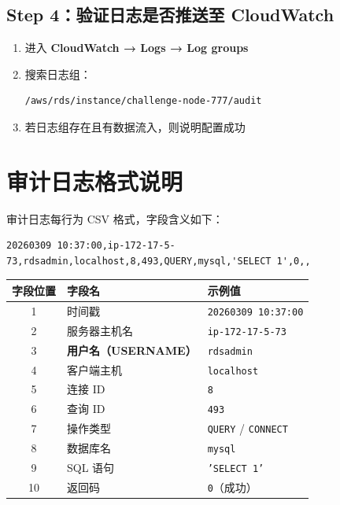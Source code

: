 \documentclass[12pt, a4paper]{article}
\begin{document}
\subsection{Step 4：验证日志是否推送至 CloudWatch}

\begin{enumerate}[leftmargin=2em]
  \item 进入 \textbf{CloudWatch → Logs → Log groups}
  \item 搜索日志组：
\begin{lstlisting}[language=bash]
/aws/rds/instance/challenge-node-777/audit
\end{lstlisting}
  \item 若日志组存在且有数据流入，则说明配置成功
\end{enumerate}

\section{审计日志格式说明}

审计日志每行为 CSV 格式，字段含义如下：

\begin{lstlisting}
20260309 10:37:00,ip-172-17-5-73,rdsadmin,localhost,8,493,QUERY,mysql,'SELECT 1',0,,
\end{lstlisting}

\begin{center}
\begin{tabular}{cll}
\toprule
字段位置 & 字段名 & 示例值 \\
\midrule
1 & 时间戳 & \texttt{20260309 10:37:00} \\
2 & 服务器主机名 & \texttt{ip-172-17-5-73} \\
3 & \textbf{用户名（USERNAME）} & \texttt{rdsadmin} \\
4 & 客户端主机 & \texttt{localhost} \\
5 & 连接 ID & \texttt{8} \\
6 & 查询 ID & \texttt{493} \\
7 & 操作类型 & \texttt{QUERY} / \texttt{CONNECT} \\
8 & 数据库名 & \texttt{mysql} \\
9 & SQL 语句 & \texttt{'SELECT 1'} \\
10 & 返回码 & \texttt{0}（成功） \\
\bottomrule
\end{tabular}
\end{center}
\end{document}
